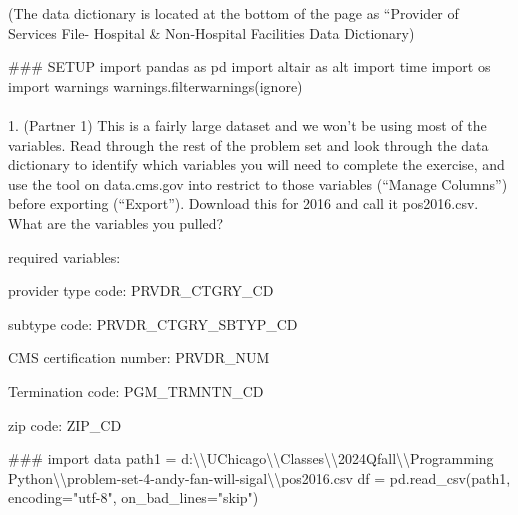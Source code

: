 \documentclass[
  letterpaper,
  DIV=11,
  numbers=noendperiod]{scrartcl}
\makeatletter
\let\oldparagraph\paragraph
\renewcommand{\paragraph}{
    \@ifstar
      \xxxParagraphStar
      \xxxParagraphNoStar
  }
\newcommand{\xxxParagraphStar}[1]{\oldparagraph*{#1}\mbox{}}
\newcommand{\xxxParagraphNoStar}[1]{\oldparagraph{#1}\mbox{}}
\newenvironment{Shaded}{\begin{snugshade}}{\end{snugshade}}
\newcommand{\CharTok}[1]{\textcolor[rgb]{0.13,0.47,0.30}{#1}}
\newcommand{\CommentTok}[1]{\textcolor[rgb]{0.37,0.37,0.37}{#1}}
\newcommand{\ImportTok}[1]{\textcolor[rgb]{0.00,0.46,0.62}{#1}}
\newcommand{\NormalTok}[1]{\textcolor[rgb]{0.00,0.23,0.31}{#1}}
\newcommand{\OperatorTok}[1]{\textcolor[rgb]{0.37,0.37,0.37}{#1}}
\newcommand{\StringTok}[1]{\textcolor[rgb]{0.13,0.47,0.30}{#1}}
\makeatother
\begin{document}
(The data dictionary is located at the bottom of the page as ``Provider
of Services File- Hospital \& Non-Hospital Facilities Data Dictionary)

\begin{Shaded}
\begin{Highlighting}[]
\CommentTok{\#\#\# SETUP }
\ImportTok{import}\NormalTok{ pandas }\ImportTok{as}\NormalTok{ pd}
\ImportTok{import}\NormalTok{ altair }\ImportTok{as}\NormalTok{ alt}
\ImportTok{import}\NormalTok{ time}
\ImportTok{import}\NormalTok{ os}
\ImportTok{import}\NormalTok{ warnings }
\NormalTok{warnings.filterwarnings(}\StringTok{\textquotesingle{}ignore\textquotesingle{}}\NormalTok{)}
\end{Highlighting}
\end{Shaded}

\paragraph{1. (Partner 1) This is a fairly large dataset and we won't be
using most of the variables. Read through the rest of the problem set
and look through the data dictionary to identify which variables you
will need to complete the exercise, and use the tool on data.cms.gov
into restrict to those variables (``Manage Columns'') before exporting
(``Export''). Download this for 2016 and call it pos2016.csv. What are
the variables you
pulled?}\label{partner-1-this-is-a-fairly-large-dataset-and-we-wont-be-using-most-of-the-variables.-read-through-the-rest-of-the-problem-set-and-look-through-the-data-dictionary-to-identify-which-variables-you-will-need-to-complete-the-exercise-and-use-the-tool-on-data.cms.gov-into-restrict-to-those-variables-manage-columns-before-exporting-export.-download-this-for-2016-and-call-it-pos2016.csv.-what-are-the-variables-you-pulled}

required variables:

provider type code: PRVDR\_CTGRY\_CD

subtype code: PRVDR\_CTGRY\_SBTYP\_CD

CMS certification number: PRVDR\_NUM

Termination code: PGM\_TRMNTN\_CD

zip code: ZIP\_CD

\begin{Shaded}
\begin{Highlighting}[]
\CommentTok{\#\#\# import data}
\NormalTok{path1 }\OperatorTok{=} \StringTok{\textquotesingle{}d:}\CharTok{\textbackslash{}\textbackslash{}}\StringTok{UChicago}\CharTok{\textbackslash{}\textbackslash{}}\StringTok{Classes}\CharTok{\textbackslash{}\textbackslash{}}\StringTok{2024Qfall}\CharTok{\textbackslash{}\textbackslash{}}\StringTok{Programming Python}\CharTok{\textbackslash{}\textbackslash{}}\StringTok{problem{-}set{-}4{-}andy{-}fan{-}will{-}sigal}\CharTok{\textbackslash{}\textbackslash{}}\StringTok{pos2016.csv\textquotesingle{}}
\NormalTok{df }\OperatorTok{=}\NormalTok{ pd.read\_csv(path1, encoding}\OperatorTok{=}\StringTok{"utf{-}8"}\NormalTok{, on\_bad\_lines}\OperatorTok{=}\StringTok{"skip"}\NormalTok{)}
\end{Highlighting}
\end{Shaded}
\end{document}
